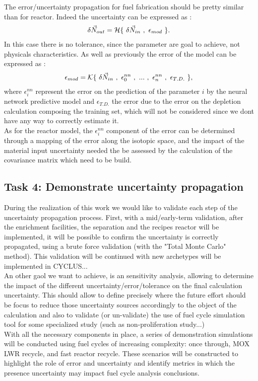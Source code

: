\documentclass[dvips,12pt]{article}
\begin{document}
The error/uncertainty propagation for fuel
fabrication should be pretty similar than for
reactor. Indeed the uncertainty can be expressed
as :
\begin{align}
\delta \vec{N}_{out} = {\cal H}\{~\delta\vec{N}_{in}~,~\epsilon_{mod}~\}.
\end{align}
In this case there is no tolerance, since the
parameter are goal to achieve, not physicals
characteristics. As well as previously the error
of the model can be expressed as :
\begin{align}
\epsilon_{mod} = {\cal K}\{~\delta\vec{N}_{in}~,~\epsilon^{nn}_{0}~,~...~,~\epsilon^{nn}_{n}~,~\epsilon_{T.D.}~\},
\end{align}
 where $\epsilon^{nn}_{i}$ represent the error on
 the prediction of the parameter $i$ by the neural
 network predictive model and $\epsilon_{T.D.}$
 the error due to the error on the depletion
 calculation composing the training set, which
 will not be considered since we dont have any way
 to correctly estimate it.\\
 
 As for the reactor model, the $\epsilon^{nn}_{i}$
 component of the error can be determined through
 a mapping of the error along the isotopic space,
 and the impact of the material input uncertainty
 needed the be assessed by the calculation of the
 covariance matrix which need to be build.

\subsection{Task 4: Demonstrate uncertainty propagation}
During the realization of this work we would like
to validate each step of the uncertainty
propagation process. First, with a mid/early-term
validation, after the enrichment facilities, the
separation and the recipes reactor will be
implemented, it will be possible to confirm the
uncertainty is correctly propagated, using a brute
force validation (with the "Total Monte Carlo"
method). This validation will be continued with
new archetypes will be implemented in CYCLUS...\\
An other gaol we want to achieve, is an
sensitivity analysis, allowing to determine the
impact of the different
uncertainty/error/tolerance on the final
calculation uncertainty. This should allow to
define precisely where the future effort should be
focus to reduce those uncertainty sources
accordingly to the object of the calculation and
also to validate (or un-validate) the use of fuel
cycle simulation tool for some specialized study
(such as non-proliferation study...)\\
With all the necessary components in place, a
series of demonstration simulations will be
conducted using fuel cycles of increasing
complexity: once through, MOX LWR recycle, and
fast reactor recycle.  These scenarios will be
constructed to highlight the role of error and
uncertainty and identify metrics in which the
presence uncertainty may impact fuel cycle
analysis conclusions.
\end{document}
